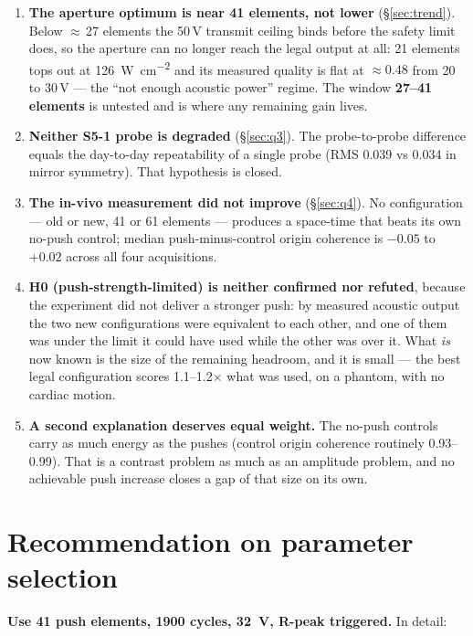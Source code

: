 \documentclass[11pt,a4paper]{article}
\newcommand{\good}[1]{\textcolor{green!45!black}{\textbf{#1}}}
\begin{document}
\begin{enumerate}[label=\textbf{C\arabic*.},leftmargin=2.6em]
{  the $I_\mathrm{sppa.3}$ limit}. MI is never the binding limit --- it has reached only 1.5--1.6 at
  each aperture's legal maximum. No firing-to-firing supply sag is measurable, either in the
  hydrophone repeats (1--2\,\% within a capture) or in the shear-wave data ($-1.5\,\%$ from push 0
  to push 9 across 30 configurations).
  \item \textbf{The aperture optimum is near 41 elements, not lower} (\S\ref{sec:trend}). Below
  $\approx$\,27 elements the 50\,V transmit ceiling binds before the safety limit does, so the
  aperture can no longer reach the legal output at all: 21 elements tops out at
  \SI{126}{\watt\per\square\centi\metre} and its measured quality is flat at $\approx0.48$ from 20
  to 30\,V --- the ``not enough acoustic power'' regime. The window \textbf{27--41 elements} is
  untested and is where any remaining gain lives.
  \item \textbf{Neither S5-1 probe is degraded} (\S\ref{sec:q3}). The probe-to-probe difference
  equals the day-to-day repeatability of a single probe (RMS 0.039 vs 0.034 in mirror symmetry).
  That hypothesis is closed.
  \item \textbf{The in-vivo measurement did not improve} (\S\ref{sec:q4}). No configuration --- old
  or new, 41 or 61 elements --- produces a space-time that beats its own no-push control; median
  push-minus-control origin coherence is $-0.05$ to $+0.02$ across all four acquisitions.
  \item \textbf{H0 (push-strength-limited) is neither confirmed nor refuted}, because the experiment
  did not deliver a stronger push: by measured acoustic output the two new configurations were
  equivalent to each other, and one of them was under the limit it could have used while the other
  was over it. What \emph{is} now known is the size of the remaining headroom, and it is small ---
  the best legal configuration scores 1.1--1.2$\times$ what was used, on a phantom, with no cardiac
  motion.
  \item \textbf{A second explanation deserves equal weight.} The no-push controls carry as much
  energy as the pushes (control origin coherence routinely 0.93--0.99). That is a contrast problem
  as much as an amplitude problem, and no achievable push increase closes a gap of that size on its
  own.
\end{enumerate}

\section{Recommendation on parameter selection}\label{sec:recommend}
\good{Use 41 push elements, 1900 cycles, \SI{32}{\volt}, R-peak triggered.} In detail:
\end{document}
